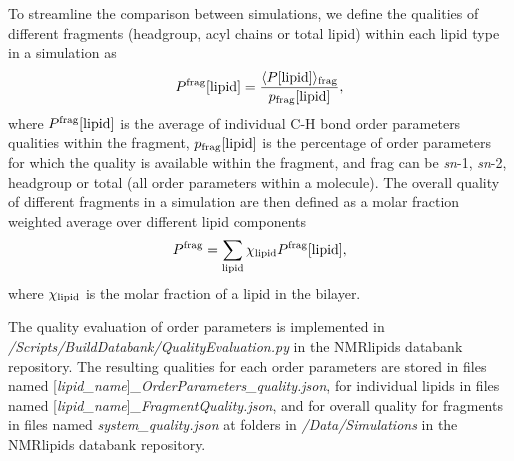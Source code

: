 \documentclass[fleqn,10pt]{wlscirep}
\begin{document}

To streamline the comparison between simulations, we define the qualities of different fragments (headgroup, acyl chains or total lipid) within each lipid type in a simulation as
\begin{equation}
    P^{\rm frag}[{\rm lipid}] = \frac{\langle P[{\rm lipid}]\rangle_{\rm frag}}{p_{\rm frag}[{\rm lipid}]},
\end{equation}
where $P^{\rm frag}[{\rm lipid}]$ is the average of individual C-H bond order parameters qualities within the fragment, $p_{\rm frag}[{\rm lipid}]$ is the percentage of order parameters for which the quality is available within the fragment, and frag can be {\it sn}-1, {\it sn}-2, headgroup or total (all order parameters within a molecule). The overall quality of different fragments in a simulation are then defined as a molar fraction weighted average over different lipid components
\begin{equation}
    P^{\rm frag} = \sum_{\rm lipid} \chi_{\rm lipid} P^{\rm frag}[{\rm lipid}],
\end{equation}
where $\chi_{\rm lipid}$ is the molar fraction of a lipid in the bilayer.

The quality evaluation of order parameters is implemented in {\it /Scripts/BuildDatabank/QualityEvaluation.py} in the NMRlipids databank repository. The resulting qualities for each order parameters are stored in files named  [{\it lipid\_name}]{\it \_OrderParameters\_quality.json}, for individual lipids in files named [{\it lipid\_name}]{\it \_FragmentQuality.json}, and for overall quality for fragments in files named {\it system\_quality.json} at folders in {\it /Data/Simulations} in the NMRlipids databank repository. 
\end{document}
